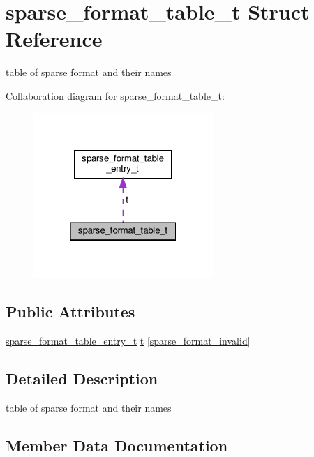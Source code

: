 \hypertarget{structsparse__format__table__t}{}\section{sparse\+\_\+format\+\_\+table\+\_\+t Struct Reference}
\label{structsparse__format__table__t}


table of sparse format and their names  




Collaboration diagram for sparse\+\_\+format\+\_\+table\+\_\+t\+:\nopagebreak
\begin{figure}[H]
\begin{center}
\leavevmode
\includegraphics[width=193pt]{structsparse__format__table__t__coll__graph}
\end{center}
\end{figure}
\subsection*{Public Attributes}
\begin{DoxyCompactItemize}
\item 
\hyperlink{structsparse__format__table__entry__t}{sparse\+\_\+format\+\_\+table\+\_\+entry\+\_\+t} \hyperlink{structsparse__format__table__t_aded298a1583f5b097749cf84621c8ef4}{t} \mbox{[}\hyperlink{spmv_8cc_a8c0094893526c01b430903b2d9227256adc326179d0d559f82edc8cd35be11de5}{sparse\+\_\+format\+\_\+invalid}\mbox{]}
\end{DoxyCompactItemize}


\subsection{Detailed Description}
table of sparse format and their names 

\subsection{Member Data Documentation}
\mbox{\label{structsparse__format__table__t_aded298a1583f5b097749cf84621c8ef4}} 
